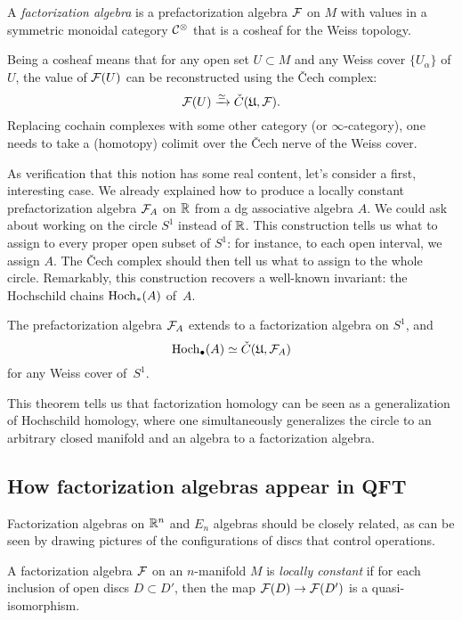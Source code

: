 \documentclass[11pt]{amsart}
\def\owen#1{{\textcolor{violet!50!black}{OG: {#1}}}}
\begin{document}
\begin{dfn}
A \emph{factorization algebra} is a prefactorization algebra $\mathcal F$ on $M$ with values in a symmetric monoidal category $\mathcal C^\otimes$ that is a cosheaf for the Weiss topology.
\end{dfn}

Being a cosheaf means that for any open set $U \subset M$ and any Weiss cover $\{ U_\alpha\}$ of $U$,
the value of $\mathcal F(U)$ can be reconstructed using the \v{C}ech complex:
\[
\mathcal F(U) \xrightarrow{\simeq} \check{C}(\mathfrak{U},\mathcal F).
\]
Replacing cochain complexes with some other category (or $\infty$-category), one needs to take a (homotopy) colimit over the \v{C}ech nerve of the Weiss cover.

As verification that this notion has some real content, let's consider a first, interesting case.
We already explained how to produce a locally constant prefactorization algebra $\mathcal F_A$ on $\mathbb R$ from a dg associative algebra $A$.
We could ask about working on the circle $S^1$ instead of $\mathbb R$.
This construction tells us what to assign to every proper open subset of $S^1$: for instance, to each open interval, we assign $A$.
The \v{C}ech complex should then tell us what to assign to the whole circle.
Remarkably, this construction recovers a well-known invariant: the Hochschild chains ${\rm Hoch}_*(A)$ of~$A$.

\begin{thm}[\owen{citations}]
The prefactorization algebra $\mathcal F_A$ extends to a factorization algebra on $S^1$, and
\[
{\rm Hoch}_\bullet(A) \simeq \check{C}(\mathfrak{U},\mathcal F_A)
\]
for any Weiss cover of~$S^1$.
\end{thm}

This theorem tells us that factorization homology can be seen as a generalization of Hochschild homology,
where one simultaneously generalizes the circle to an arbitrary closed manifold and an algebra to a factorization algebra.

\subsection{How factorization algebras appear in QFT}

Factorization algebras on $\mathbb R^n$ and $E_n$ algebras should be closely related,
as can be seen by drawing pictures of the configurations of discs that control operations.

\begin{dfn}
A factorization algebra $\mathcal F$ on an $n$-manifold $M$ is \emph{locally constant} if for each inclusion of open discs $D \subset D'$, then the map $\mathcal F(D) \to \mathcal F(D')$ is a quasi-isomorphism.
\end{dfn}
\end{document}
